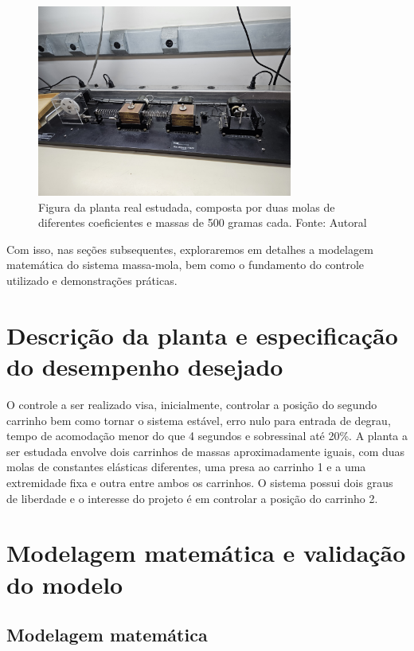 \documentclass{ifacconf}
\begin{document}
\begin{figure}[!htb]
  \begin{center}
  \includegraphics[width=8.4cm]{figures/planta_padrao.jpg}    %
  \caption{Figura da planta real estudada, composta por duas molas de diferentes coeficientes e massas de 500 gramas cada. Fonte: Autoral} 
  \label{fig:planta_padrao}
  \end{center}
\end{figure}

Com isso, nas seções subsequentes, exploraremos em detalhes a modelagem matemática do sistema
massa-mola, bem como o fundamento do controle utilizado e demonstrações práticas.

\section{Descrição da planta e especificação do desempenho desejado}

O controle a ser realizado visa, inicialmente, controlar a posição do segundo carrinho bem como tornar o sistema estável, erro nulo para entrada de degrau, 
tempo de acomodação menor do que 4 segundos e sobressinal até 20\%.
A planta a ser estudada envolve dois carrinhos de massas aproximadamente iguais, com duas molas de constantes elásticas diferentes, uma presa ao carrinho 1 
e a uma extremidade fixa e outra entre ambos os carrinhos. O sistema possui dois graus de liberdade e o interesse do projeto é em controlar a posição do carrinho 2.


\section{Modelagem matemática e validação do modelo}



\subsection{Modelagem matemática}
\end{document}
